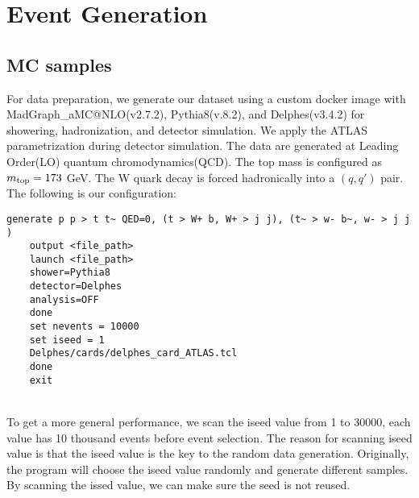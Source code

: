 \chapter{Event Generation}\label{Event Generation}



\section{MC samples}\label{sec:MC sample}
For data preparation, we generate our dataset using a custom docker image with MadGraph\_aMC@NLO(v2.7.2), Pythia8(v.8.2), and Delphes(v3.4.2) for showering, hadronization, and detector simulation. We apply the ATLAS parametrization during detector simulation.  The data are generated at Leading Order(LO) quantum chromodynamics(QCD). The top mass is configured as $m_{\rm top}=173$ GeV. The W quark decay is forced hadronically into a $(q, q')$ pair. The following is our configuration:
\\
\begin{adjustbox}{max width=\textwidth}
\centering
\begin{lstlisting}[caption={Configuration for generating samples. The ``iseed'' is just a placeholder, it will be changed when generating samples.},captionpos=b]
	generate p p > t t~ QED=0, (t > W+ b, W+ > j j), (t~ > w- b~, w- > j j ) 
	output <file_path> 
	launch <file_path> 
	shower=Pythia8  
	detector=Delphes 
	analysis=OFF 
	done  
	set nevents = 10000 
	set iseed = 1 
	Delphes/cards/delphes_card_ATLAS.tcl
	done 
	exit 
\end{lstlisting}
\end{adjustbox}
\\
To get a more general performance, we scan the iseed value from 1 to 30000, each value has 10 thousand events before event selection. The reason for scanning iseed value is that the iseed value is the key to the random data generation. Originally, the program will choose the iseed value randomly and generate different samples. By scanning the issed value, we can make sure the seed is not reused. 





